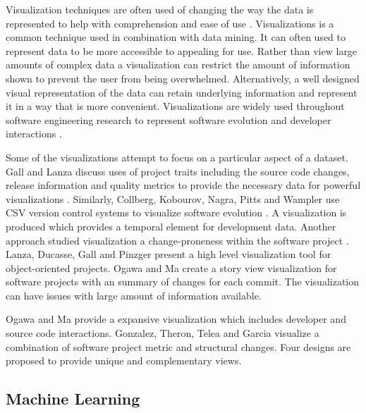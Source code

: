 Visualization techniques are often used of changing the way the data is represented to help with comprehension and ease of use \cite{Bieman2003a, Gall2006, Keim2002}. Visualizations is a common technique used in combination with data mining. It can often used to represent data to be more accessible to appealing for use. Rather than view large amounts of complex data a visualization can restrict the amount of information shown to prevent the user from being overwhelmed. Alternatively, a well designed visual representation of the data can retain underlying information and represent it in a way that is more convenient. Visualizations are widely used throughout software engineering research to represent software evolution \cite{Bieman2003a, Collberg2003, Gall2006, Keim2002, Ma2008, Salamanca2009} and developer interactions \cite{DeSouza2007, Gilbert2007, Ma2008, Ogawa2010, Salamanca2009}.

Some of the visualizations attempt to focus on a particular aspect of a dataset. Gall and Lanza discuss uses of project traits including the source code changes, release information and quality metrics to provide the necessary data for powerful visualizations \cite{Gall2006}. Similarly, Collberg, Kobourov, Nagra, Pitts and Wampler use CSV version control systems to visualize software evolution \cite{Collberg2003}. A visualization is produced which provides a temporal element for development data. Another approach studied visualization a change-proneness within the software project \cite{Bieman2003a}. Lanza, Ducasse, Gall and Pinzger present a high level visualization tool for object-oriented projects\cite{Lanza2005}. Ogawa and Ma create a story view visualization for software projects with an summary of changes for each commit\cite{Ogawa2010}. The visualization can have issues with large amount of information available.

Ogawa and Ma provide a expansive visualization which includes developer and source code interactions\cite{Ma2008}. Gonzalez, Theron, Telea and Garcia visualize a combination of software project metric and structural changes. Four designs are proposed to provide unique and complementary views.

\subsection{Machine Learning}

